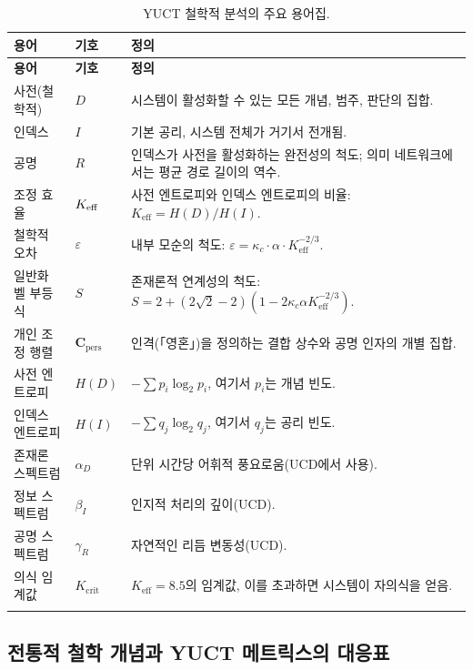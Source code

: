 \documentclass[11pt,a4paper]{article}
\newcommand{\kappac}{\kappa_c}
\newcommand{\eps}{\varepsilon}
\newcommand{\Cpers}{\mathbf{C}_{\text{pers}}}
\begin{document}
	\begin{longtable}{p{3.5cm}p{5cm}p{4cm}}
		\toprule
		\textbf{용어} & \textbf{기호} & \textbf{정의} \\
		\midrule
		\endfirsthead
		\toprule
		\textbf{용어} & \textbf{기호} & \textbf{정의} \\
		\midrule
		\endhead
		사전(철학적) & \(D\) & 시스템이 활성화할 수 있는 모든 개념, 범주, 판단의 집합. \\
		인덱스 & \(I\) & 기본 공리, 시스템 전체가 거기서 전개됨. \\
		공명 & \(R\) & 인덱스가 사전을 활성화하는 완전성의 척도; 의미 네트워크에서는 평균 경로 길이의 역수. \\
		조정 효율 & \(\Keff\) & 사전 엔트로피와 인덱스 엔트로피의 비율: \(K_{\mathrm{eff}} = H(D)/H(I)\). \\
		철학적 오차 & \(\eps\) & 내부 모순의 척도: \(\eps = \kappac \cdot \alpha \cdot K_{\mathrm{eff}}^{-2/3}\). \\
		일반화 벨 부등식 & \(S\) & 존재론적 연계성의 척도: \(S = 2 + (2\sqrt{2}-2)(1 - 2\kappac\alpha K_{\mathrm{eff}}^{-2/3})\). \\
		개인 조정 행렬 & \(\Cpers\) & 인격(「영혼」)을 정의하는 결합 상수와 공명 인자의 개별 집합. \\
		사전 엔트로피 & \(H(D)\) & \( -\sum p_i \log_2 p_i\), 여기서 \(p_i\)는 개념 빈도. \\
		인덱스 엔트로피 & \(H(I)\) & \( -\sum q_j \log_2 q_j\), 여기서 \(q_j\)는 공리 빈도. \\
		존재론 스펙트럼 & \(\alpha_D\) & 단위 시간당 어휘적 풍요로움(UCD에서 사용). \\
		정보 스펙트럼 & \(\beta_I\) & 인지적 처리의 깊이(UCD). \\
		공명 스펙트럼 & \(\gamma_R\) & 자연적인 리듬 변동성(UCD). \\
		의식 임계값 & \(K_{\mathrm{crit}}\) & \(K_{\mathrm{eff}} = 8.5\)의 임계값, 이를 초과하면 시스템이 자의식을 얻음. \\
		\bottomrule
		\caption{YUCT 철학적 분석의 주요 용어집.}
		\label{tab:glossary}
	\end{longtable}
	
	\subsection{전통적 철학 개념과 YUCT 메트릭스의 대응표}
	
\end{document}
